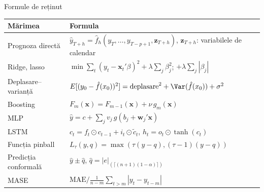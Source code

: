 \begin{frame}{Formule de reținut}
\itemsize{\small}
{\renewcommand{\arraystretch}{1.35}\begin{center}
\footnotesize
\begin{tabular}{ll}
\toprule
\textbf{Mărimea} & \textbf{Formula} \\
\midrule
Prognoza directă & $\hat y_{T+h} = \hat f_h(y_T, \dots, y_{T-p+1}, \mathbf{z}_{T+h})$, $\mathbf{z}_{T+h}$: variabilele de calendar \\
Ridge, lasso & $\min \sum_t (y_t - \mathbf{x}_t'\beta)^2 + \lambda\sum_j\beta_j^2$; \quad $+ \lambda\sum_j|\beta_j|$ \\
Deplasare--varianță & $E[(y_0 - \hat f(x_0))^2] = \text{deplasare}^2 + \Var(\hat f(x_0)) + \sigma^2$ \\
Boosting & $F_m(\mathbf{x}) = F_{m-1}(\mathbf{x}) + \nu\,g_m(\mathbf{x})$ \\
MLP & $\hat y = c + \sum_j v_j\,g(b_j + \mathbf{w}_j'\mathbf{x})$ \\
LSTM & $c_t = f_t \odot c_{t-1} + i_t \odot \tilde c_t$, \quad $h_t = o_t \odot \tanh(c_t)$ \\
Funcția pinball & $L_\tau(y, q) = \max(\tau(y - q), (\tau - 1)(y - q))$ \\
Predicția conformală & $\hat y \pm \hat q$, \quad $\hat q = |e|_{(\lceil (n+1)(1-\alpha) \rceil)}$ \\
MASE & $\text{MAE} / \frac{1}{n-m}\sum_{t>m}|y_t - y_{t-m}|$ \\
\bottomrule
\end{tabular}
\end{center}
}
\end{frame}

